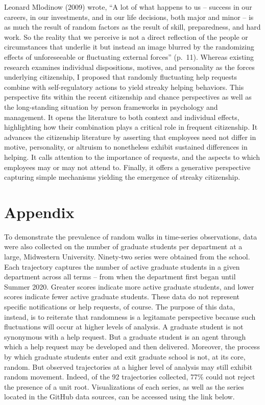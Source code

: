 \documentclass[english,,man]{apa6}
\begin{document}
Leonard Mlodinow (2009) wrote, \enquote{A lot of what happens to us -- success in our careers, in our investments, and in our life decisions, both major and minor -- is as much the result of random factors as the result of skill, preparedness, and hard work. So the reality that we perceive is not a direct reflection of the people or circumstances that underlie it but instead an image blurred by the randomizing effects of unforeseeable or fluctuating external forces} (p.~11). Whereas existing research examines individual dispositions, motives, and personality as the forces underlying citizenship, I proposed that randomly fluctuating help requests combine with self-regulatory actions to yield streaky helping behaviors. This perspective fits within the recent citizenship and chance perspectives as well as the long-standing situation by person frameworks in psychology and management. It opens the literature to both context and individual effects, highlighting how their combination plays a critical role in frequent citizenship. It advances the citizenship literature by asserting that employees need not differ in motive, personality, or altruism to nonetheless exhibit sustained differences in helping. It calls attention to the importance of requests, and the aspects to which employees may or may not attend to. Finally, it offers a generative perspective capturing simple mechanisms yielding the emergence of streaky citizenship.

\hypertarget{appendix}{%
\section{Appendix}\label{appendix}}

To demonstrate the prevalence of random walks in time-series observations, data were also collected on the number of graduate students per department at a large, Midwestern University. Ninety-two series were obtained from the school. Each trajectory captures the number of active graduate students in a given department across all terms -- from when the department first began until Summer 2020. Greater scores indicate more active graduate students, and lower scores indicate fewer active graduate students. These data do not represent specific notifications or help requests, of course. The purpose of this data, instead, is to reiterate that randomness is a legitamate perspective because such fluctuations will occur at higher levels of analysis. A graduate student is not synonymous with a help request. But a graduate student is an agent through which a help request may be developed and then delivered. Moreover, the process by which graduate students enter and exit graduate school is not, at its core, random. But observed trajectories at a higher level of analysis may still exhibit random movement. Indeed, of the 92 trajectories collected, 77\% could not reject the presence of a unit root. Visualizations of each series, as well as the series located in the GitHub data sources, can be accessed using the link below.
\end{document}
